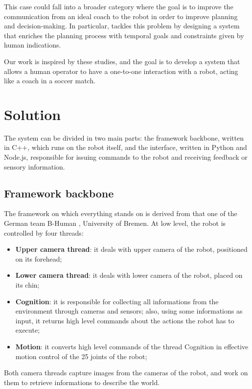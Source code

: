 \documentclass[a4paper, onecolumn, 12pt]{article}
\begin{document}
This case could fall into a broader category where the goal is to improve the
communication from an ideal coach to the robot in order to improve planning and
decision-making. In particular, \cite{musumeci} tackles this problem by
designing a system that enriches the planning process with temporal goals and
constraints given by human indications. 

Our work is inspired by these studies, and the goal is to develop a system that
allows a human operator to have a one-to-one interaction with a robot, acting
like a coach in a soccer match.

\newpage
\section{Solution}
\label{sec:sol}

The system can be divided in two main parts: the framework backbone, written in
C++, which runs on the robot itself, and the interface, written in Python and
Node.js, responsible for issuing commands to the robot and receiving feedback or
sensory information. 

\subsection{Framework backbone}
The framework on which everything stands on is derived from that one of the
German team B-Human \cite{bhuman2023}, University of Bremen. At low level, the robot is 
controlled by four threads:
\begin{itemize}
    \item \textbf{Upper camera thread}: it deals with upper camera of the robot, positioned on its forehead;
    \item \textbf{Lower camera thread}: it deals with lower camera of the robot, placed on its chin;
    \item \textbf{Cognition}: it is responsible for collecting all informations from the 
    environment through cameras and sensors; also, using some informations as input,
    it returns high level commands about the actions the robot has to execute;
    \item \textbf{Motion}: it converts high level commands of the thread Cognition in effective
    motion control of the 25 joints of the robot;
\end{itemize}
Both camera threads capture images from the cameras of the robot, and work on them 
to retrieve informations to describe the world.
\end{document}
